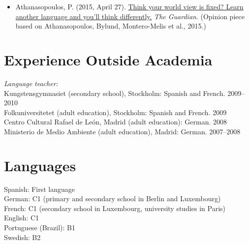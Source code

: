 \documentclass[margin, 11pt]{res} %
\begin{document}
\begin{resume}
\begin{itemize}
\item Athanasopoulos, P. (2015, April 27). \href{https://www.theguardian.com/commentisfree/2015/apr/27/world-view-learn-another-language}{Think your world view is fixed? Learn another language and you'll think differently.} \emph{The Guardian}. (Opinion piece based on Athanasopoulos, Bylund, Montero-Melis et al., 2015.)

\end{itemize}


 
\section{\sc Experience Outside Academia}

\textsl{Language teacher:} \\
Kungstensgymnasiet (secondary school), Stockholm: Spanish  and French. 2009--2010 \\
Folkuniversitetet (adult education), Stockholm: Spanish and French. 2009 \\
Centro Cultural Rafael de Le\'{o}n, Madrid (adult education): German. 2008 \\ 
Ministerio de Medio Ambiente (adult education), Madrid: German. 2007--2008 \\ 







\section{\sc Languages}

Spanish: First language \\
German: C1 (primary and secondary school in Berlin and Luxembourg)\\
French: C1 (secondary school in Luxembourg, university studies in Paris)\\
English: C1\\
Portuguese (Brazil): B1\\
Swedish: B2\\



\end{resume}
\end{document}
